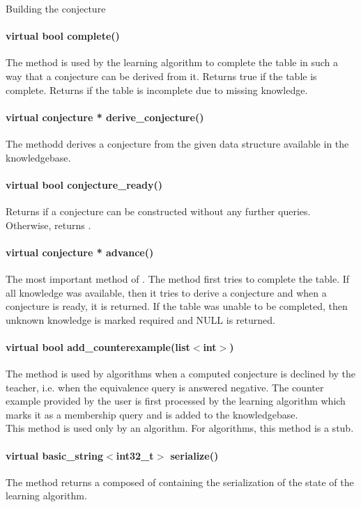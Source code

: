 \vskip 1pt
Building the conjecture \vskip 1pt

\paragraph{virtual bool complete()}
The method is used by the learning algorithm to complete the table in such a way that a conjecture can be derived from it. Returns true if the table is complete. Returns \false if the table is incomplete due to missing knowledge. 

\paragraph{virtual conjecture * derive\_conjecture()}
The methodd derives a conjecture from the given data structure available in the knowledgebase. 

\paragraph{virtual bool conjecture\_ready()}
Returns \true if a conjecture can be constructed without any further queries. Otherwise, returns \false.

\paragraph{virtual conjecture * advance()}
The most important method of . The method first tries to complete the table. If all knowledge was available, then it tries to derive a conjecture and when a conjecture is ready, it is returned. If the table was unable to be completed, then unknown knowledge is marked required and NULL is returned.

\paragraph{virtual bool add\_counterexample(list$<$int$>$)}
The method is used by \online algorithms when a computed conjecture is declined by the teacher, i.e. when the equivalence query is answered negative. The counter example provided by the user is first processed by the learning algorithm which marks it as a membership query and is added to the knowledgebase. \\
This method is used only by an \online algorithm. For \offline algorithms, this method is a stub.

\paragraph{virtual basic\_string$<$int32\_t$>$ serialize()}
The method returns a \stringtype composed of \integer containing the serialization of the state of the learning algorithm.

